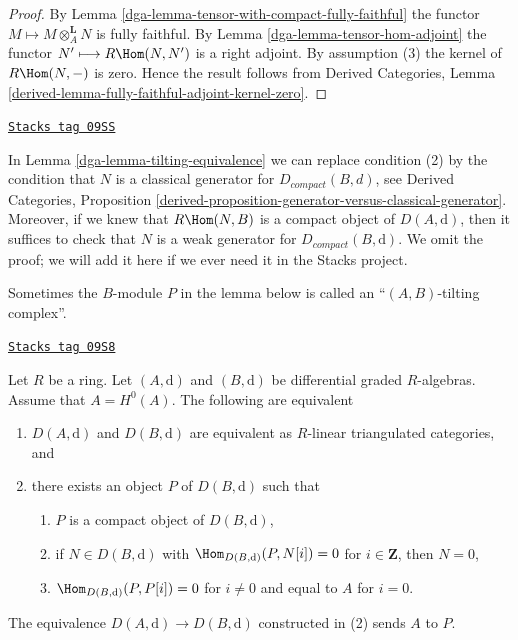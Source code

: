 \begin{proof}

By Lemma \ref{dga-lemma-tensor-with-compact-fully-faithful}
the functor $M \longmapsto M \otimes_A^\mathbf{L} N$ is
fully faithful. By Lemma \ref{dga-lemma-tensor-hom-adjoint}
the functor $N' \longmapsto R\Hom(N, N')$ is a right adjoint.
By assumption (3) the kernel of $R\Hom(N, -)$ is zero.
Hence the result follows from
Derived Categories, Lemma
\ref{derived-lemma-fully-faithful-adjoint-kernel-zero}.
\end{proof}

\begin{remark}
\label{dga-remark-tilting-equivalence}
\href{https://stacks.math.columbia.edu/tag/09SS}{\texttt{Stacks tag 09SS}}

In Lemma \ref{dga-lemma-tilting-equivalence} we can replace
condition (2) by the condition that $N$ is a classical
generator for $D_{compact}(B, d)$, see
Derived Categories, Proposition
\ref{derived-proposition-generator-versus-classical-generator}.
Moreover, if we knew that $R\Hom(N, B)$ is a compact object
of $D(A, \text{d})$, then it suffices to check that $N$
is a weak generator for $D_{compact}(B, \text{d})$.
We omit the proof; we will add it here if we ever
need it in the Stacks project.
\end{remark}

Sometimes the $B$-module $P$ in the lemma below is called an
``$(A, B)$-tilting complex''.

\begin{lemma}[Rickard]
\label{dga-lemma-rickard}
\href{https://stacks.math.columbia.edu/tag/09S8}{\texttt{Stacks tag 09S8}}

Let $R$ be a ring. Let $(A, \text{d})$ and $(B, \text{d})$ be
differential graded $R$-algebras. Assume that $A = H^0(A)$.
The following are equivalent
\begin{enumerate}
\item $D(A, \text{d})$ and $D(B, \text{d})$ are equivalent as $R$-linear
triangulated categories, and
\item there exists an object $P$ of $D(B, \text{d})$ such that
\begin{enumerate}
\item $P$ is a compact object of $D(B, \text{d})$,
\item if $N \in D(B, \text{d})$ with $\Hom_{D(B, \text{d})}(P, N[i]) = 0$
for $i \in \mathbf{Z}$, then $N = 0$,
\item $\Hom_{D(B, \text{d})}(P, P[i]) = 0$ for $i \not = 0$ and
equal to $A$ for $i = 0$.
\end{enumerate}
\end{enumerate}
The equivalence $D(A, \text{d}) \to D(B, \text{d})$
constructed in (2) sends $A$ to $P$.
\end{lemma}

